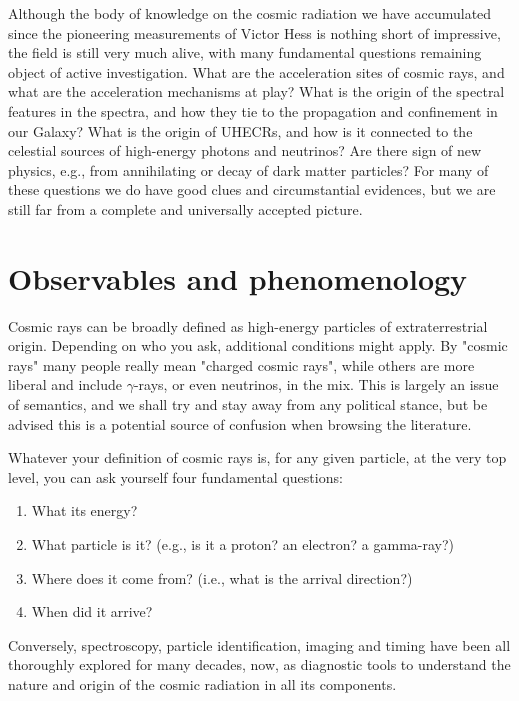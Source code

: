 Although the body of knowledge on the cosmic radiation we have accumulated since the
pioneering measurements of Victor Hess is nothing short of impressive, the field
is still very much alive, with many fundamental questions remaining object of active
investigation. What are the acceleration sites of cosmic rays, and what are the
acceleration mechanisms at play? What is the origin of the spectral features in
the spectra, and how they tie to the propagation and confinement in our Galaxy?
What is the origin of UHECRs, and how is it connected to the celestial sources of
high-energy photons and neutrinos? Are there sign of new physics, e.g., from annihilating
or decay of dark matter particles? For many of these questions we do have good clues and
circumstantial evidences, but we are still far from a complete and universally accepted
picture.


\section{Observables and phenomenology}

Cosmic rays can be broadly defined as high-energy particles of extraterrestrial
origin. Depending on who you ask, additional conditions might apply. By "cosmic rays"
many people really mean "charged cosmic rays", while others are more liberal and
include $\gamma$-rays, or even neutrinos, in the mix. This is largely an issue of
semantics, and we shall try and stay away from any political stance, but be advised
this is a potential source of confusion when browsing the literature.

Whatever your definition of cosmic rays is, for any given particle, at the very
top level, you can ask yourself four fundamental questions:
\begin{enumerate}
  \item What its energy?
  \item What particle is it? (e.g., is it a proton? an electron? a gamma-ray?)
  \item Where does it come from? (i.e., what is the arrival direction?)
  \item When did it arrive?
\end{enumerate}
Conversely, spectroscopy, particle identification, imaging and timing have been all
thoroughly explored for many decades, now, as diagnostic tools to understand the nature
and origin of the cosmic radiation in all its components.

